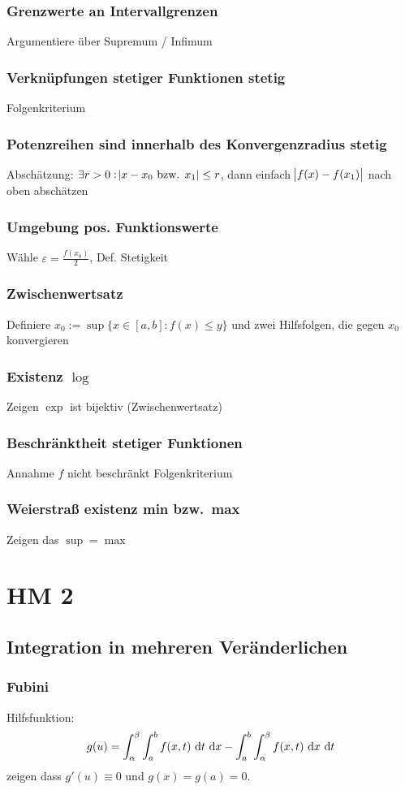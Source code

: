 \subsection{Grenzwerte an Intervallgrenzen }
 Argumentiere über Supremum / Infimum
\subsection{Verknüpfungen stetiger Funktionen stetig }
 Folgenkriterium
\subsection{Potenzreihen sind innerhalb des Konvergenzradius stetig }
 Abschätzung: $\exists r>0 : \abs{x-x_0 \text{ bzw. }
 x_1} \leq r$, dann einfach $\abs{f(x)-f(x_1)}$ nach oben abschätzen
\subsection{Umgebung pos. Funktionswerte }
 Wähle $\varepsilon = \frac{f(x_0)}{2}$, Def. Stetigkeit
\subsection{Zwischenwertsatz }
 Definiere $x_0 := \sup \{x \in [a,b] : f(x) \leq y \}$ und zwei Hilfsfolgen, die gegen $x_0$ konvergieren
\subsection{Existenz $\log$ }
 Zeigen $\exp$ ist bijektiv (Zwischenwertsatz)
\subsection{Beschränktheit stetiger Funktionen}
 Annahme $f$ nicht beschränkt Folgenkriterium
\subsection{Weierstraß existenz min bzw.\ max }
 Zeigen das $\sup=\max$

 \chapter{HM 2}
 \section{Integration in mehreren Veränderlichen}
 \subsection{Fubini}
 Hilfsfunktion:
 \begin{equation*}
     g(u) = \int_\alpha^\beta \int_a^b f(x,t) \text{ d}t \text{ d}x - \int_a^b \int_\alpha^\beta
     f(x,t) \text{ d}x \text{ d}t
 \end{equation*}
 zeigen dass $g'(u) \equiv 0$ und $g(x) = g(a) = 0$.

